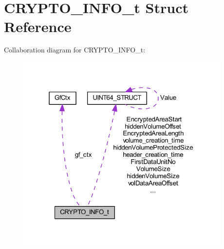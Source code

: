 \hypertarget{struct_c_r_y_p_t_o___i_n_f_o__t}{}\section{C\+R\+Y\+P\+T\+O\+\_\+\+I\+N\+F\+O\+\_\+t Struct Reference}
\label{struct_c_r_y_p_t_o___i_n_f_o__t}


Collaboration diagram for C\+R\+Y\+P\+T\+O\+\_\+\+I\+N\+F\+O\+\_\+t\+:
\nopagebreak
\begin{figure}[H]
\begin{center}
\leavevmode
\includegraphics[width=303pt]{struct_c_r_y_p_t_o___i_n_f_o__t__coll__graph}
\end{center}
\end{figure}
